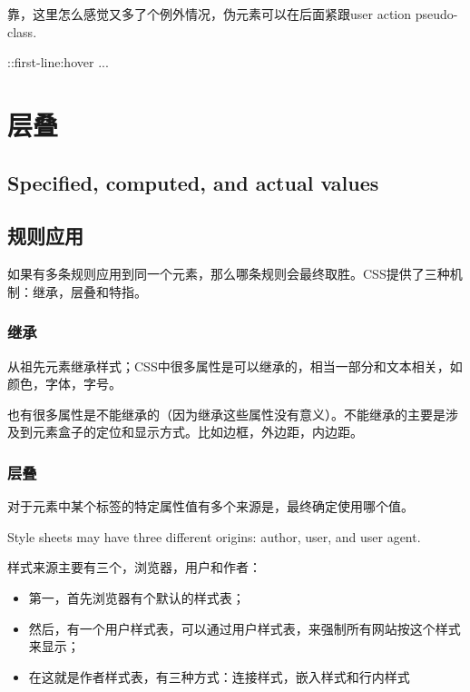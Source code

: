 靠，这里怎么感觉又多了个例外情况，伪元素可以在后面紧跟user action pseudo-class.

\begin{CSS}

::first-line:hover { ... }

\end{CSS}

\section{层叠}

\subsection{Specified, computed, and actual values}



\subsection{规则应用}

如果有多条规则应用到同一个元素，那么哪条规则会最终取胜。CSS提供了三种机制：继承，层叠和特指。


\subsubsection{继承}

从祖先元素继承样式；CSS中很多属性是可以继承的，相当一部分和文本相关，如颜色，字体，字号。

也有很多属性是不能继承的（因为继承这些属性没有意义）。不能继承的主要是涉及到元素盒子的定位和显示方式。比如边框，外边距，内边距。

\subsubsection{层叠}

对于元素中某个标签的特定属性值有多个来源是，最终确定使用哪个值。

Style sheets may have three different origins: author, user, and user agent.

样式来源主要有三个，浏览器，用户和作者：
\begin{itemize}
\item 第一，首先浏览器有个默认的样式表；
\item 然后，有一个用户样式表，可以通过用户样式表，来强制所有网站按这个样式来显示；
\item 在这就是作者样式表，有三种方式：连接样式，嵌入样式和行内样式
\end{itemize}

